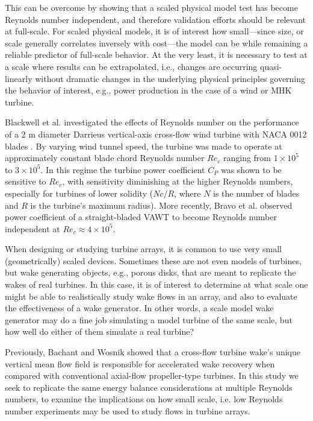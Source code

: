 \documentclass[energies,article,accept,moreauthors,pdftex,12pt,a4paper]{mdpi}
\begin{document}
This can be overcome by showing that a scaled physical model test has become 
Reynolds number independent, and therefore validation efforts should be 
relevant at full-scale.  For scaled physical models, it is of interest how
small---since size, or scale generally correlates inversely with cost---the
model can be while remaining a reliable predictor of full-scale behavior. At
the very least, it is necessary to test at a scale where results can be
extrapolated, i.e., changes are occurring quasi-linearly without dramatic 
changes in the underlying physical principles governing the behavior of 
interest, e.g., power production in the case of a wind or MHK turbine.

Blackwell et al. investigated the effects of Reynolds number on the 
performance
of a 2 m diameter Darrieus vertical-axis cross-flow wind turbine with NACA 0012
blades \cite{Blackwell1976}. By varying wind tunnel speed, the turbine was made
to operate at approximately constant blade chord Reynolds number $Re_c$ ranging
from $1 \times 10^5$ to $3 \times 10^5$. In this regime the turbine power
coefficient $C_P$ was shown to be sensitive to $Re_c$, with sensitivity
diminishing at the higher Reynolds numbers, especially for turbines of lower
solidity ($Nc/R$, where $N$ is the number of blades and $R$ is the turbine's
maximum radius). More recently, Bravo et al. observed power coefficient of a
straight-bladed VAWT to become Reynolds number independent at $Re_c \approx 4
\times 10^5$.

When designing or studying turbine arrays, it is common to use very small
(geometrically) scaled devices. 
Sometimes these are not even models of turbines, but
wake generating objects, e.g., porous disks, that are meant to replicate the
wakes of real turbines. In this case, it is of interest to determine at what
scale one might be able to realistically study wake flows in an array, and also
to evaluate the effectiveness of a wake generator. In other words, a scale 
model wake generator may do a fine job simulating a model turbine of the same 
scale, but how well do either of them simulate a real turbine?

Previously, Bachant and Wosnik \cite{Bachant2015-JoT} showed that a cross-flow
turbine wake's unique vertical mean flow field is responsible for accelerated
wake recovery when compared with conventional axial-flow propeller-type
turbines. In this study we seek to replicate the same energy balance
considerations at multiple Reynolds numbers, to examine the implications on how
small scale, i.e. low Reynolds number experiments may be used to study flows in
turbine arrays.
\end{document}
